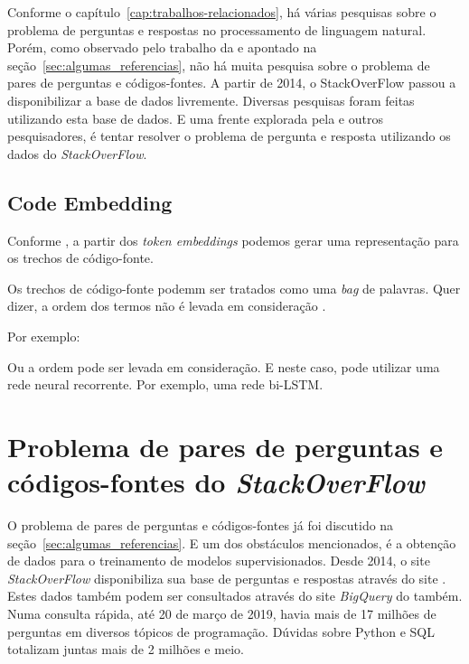   
  
  


Conforme o capítulo~\ref{cap:trabalhos-relacionados}, há várias pesquisas sobre o problema de perguntas e respostas no processamento de linguagem natural. Porém, como observado pelo trabalho da \cite{yao-2018} e apontado na seção~\ref{sec:algumas_referencias}, não há muita pesquisa sobre o problema de pares de perguntas e códigos-fontes. A partir de 2014, o StackOverFlow passou a disponibilizar a base de dados livremente. Diversas pesquisas foram feitas utilizando esta base de dados. E uma frente explorada pela \cite{yao-2018} e outros pesquisadores, é tentar resolver o problema de pergunta e resposta utilizando os dados do \textit{StackOverFlow}.

\subsection{Code Embedding}

Conforme \cite{cambronero-deep-learning-code-search:2019}, a partir dos \textit{token embeddings} podemos gerar uma representação para os trechos de código-fonte.

Os trechos de código-fonte podemm ser tratados como uma \textit{bag} de palavras. Quer dizer, a ordem dos termos não é levada em consideração \citep{cambronero-deep-learning-code-search:2019}.



Por exemplo:




Ou a ordem pode ser levada em consideração. E neste caso, pode utilizar uma rede neural recorrente. Por exemplo, uma rede bi-LSTM. 


\section{Problema de pares de perguntas e códigos-fontes do \textit{StackOverFlow}}

O problema de pares de perguntas e códigos-fontes já foi discutido na seção~\ref{sec:algumas_referencias}. E um dos obstáculos mencionados, é a obtenção de dados para o treinamento de modelos supervisionados. Desde 2014, o site \textit{StackOverFlow} disponibiliza sua base de perguntas e respostas através do site \cite{sof-2019}. Estes dados também podem ser consultados através do site \textit{BigQuery} do \cite{bigquery-2019} também. Numa consulta rápida, até 20 de março de 2019, havia mais de 17 milhões de perguntas em diversos tópicos de programação. Dúvidas sobre Python e SQL totalizam juntas mais de 2 milhões e meio.

